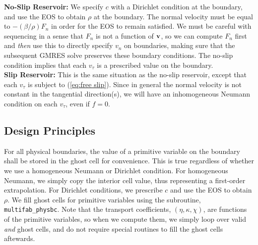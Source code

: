 \documentclass[final]{siamltex}
\def\vb {{\bf v}}
\begin{document}
{\bf No-Slip Reservoir:} We specify $c$ with a Dirichlet condition at the boundary, 
and use the EOS to obtain $\rho$ at the
boundary.  The normal velocity must be equal to $-(\beta/\rho)F_n$ in order for
the EOS to remain satisfied.  We must be careful with sequencing in a sense that
$F_n$ is not a function of $\vb$, so we can compute $F_n$ first and {\it then}
use this to directly specify $v_n$ on boundaries, making sure that the
subsequent GMRES solve preserves these boundary conditions.
The no-slip condition implies that each $v_{\tau}$ is
a prescribed value on the boundary.\\

{\bf Slip Reservoir:} This is the same situation as the no-slip reservoir, except
that each $v_{\tau}$ is subject to (\ref{eq:free slip}).  Since in general
the normal velocity is not constant in the tangential direction(s), we will have 
an inhomogeneous Neumann condition on each $v_{\tau}$, even if $f=0$.

\subsection{Design Principles}
For all physical boundaries, the value of a primitive
variable on the boundary shall be stored in the ghost cell for convenience.  This
is true regardless of whether we use a homogeneous Neumann or Dirichlet condition.
For homogeneous Neumann, we simply copy the interior cell value, thus representing
a first-order extrapolation.  For Dirichlet conditions, we prescribe $c$ and use
the EOS to obtain $\rho$.  We fill ghost cells for primitive variables using the
subroutine, {\tt multifab\_physbc}.  Note that the transport coefficients, $(\eta,\kappa,\chi)$,
are functions of the primitive variables, so when we compute them, we simply loop
over valid {\it and} ghost cells, and do not require special routines to fill
the ghost cells aftewards.\\
\end{document}
